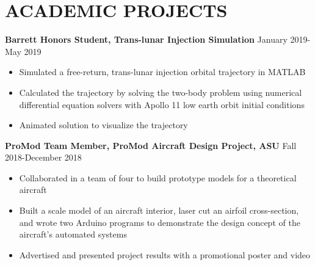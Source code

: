 \documentclass{article}
\begin{document}
\section{ACADEMIC PROJECTS}
\textbf{Barrett Honors Student, Trans-lunar Injection Simulation} 
\hfill
January 2019-May 2019
\vspace{0.5em}
\begin{itemize}
	\item Simulated a free-return, trans-lunar injection orbital trajectory in MATLAB
	\item Calculated the trajectory by solving the two-body problem using numerical differential equation solvers with Apollo 11 low earth orbit initial conditions
	\item Animated solution to visualize the trajectory
\end{itemize}
\vspace{1em}
\textbf{ProMod Team Member, ProMod Aircraft Design Project, ASU}
\hfill 
Fall 2018-December 2018
\vspace{0.5em}
\begin{itemize}
	\item Collaborated in a team of four to build prototype models for a theoretical aircraft
	\item Built a scale model of an aircraft interior, laser cut an airfoil cross-section, and wrote two Arduino programs to demonstrate the design concept of the aircraft's automated systems
	\item Advertised and presented project results with a promotional poster and video
\end{itemize}
\thispagestyle{empty}
\end{document}
